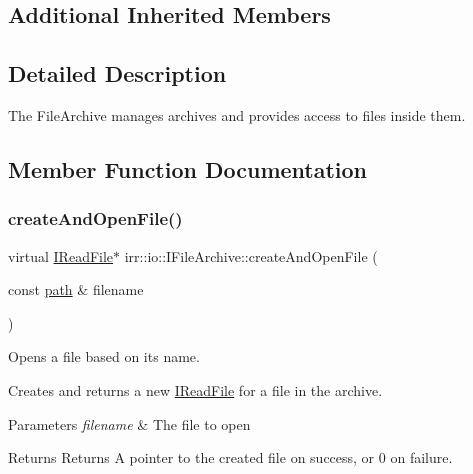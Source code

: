 \subsection*{Additional Inherited Members}


\subsection{Detailed Description}
The File\+Archive manages archives and provides access to files inside them. 

\subsection{Member Function Documentation}
\mbox{\label{classirr_1_1io_1_1IFileArchive_a5c3b4994ae63447d2634dd86b3069988}} 
\subsubsection{\texorpdfstring{create\+And\+Open\+File()}{createAndOpenFile()}\hspace{0.1cm}{\footnotesize\ttfamily [1/2]}}
{\footnotesize\ttfamily virtual \hyperlink{classirr_1_1io_1_1IReadFile}{I\+Read\+File}$\ast$ irr\+::io\+::\+I\+File\+Archive\+::create\+And\+Open\+File (\begin{DoxyParamCaption}\item[{const \hyperlink{namespaceirr_1_1io_ab1bdc45edb3f94d8319c02bc0f840ee1}{path} \&}]{filename }\end{DoxyParamCaption})\hspace{0.3cm}{\ttfamily [pure virtual]}}



Opens a file based on its name. 

Creates and returns a new \hyperlink{classirr_1_1io_1_1IReadFile}{I\+Read\+File} for a file in the archive. 
\begin{DoxyParams}{Parameters}
{\em filename} & The file to open \\
\hline
\end{DoxyParams}
\begin{DoxyReturn}{Returns}
Returns A pointer to the created file on success, or 0 on failure. 
\end{DoxyReturn}
\mbox{\label{classirr_1_1io_1_1IFileArchive_ab6bc8fbd660bbbe42b4d30a9d4f26c7d}} 
